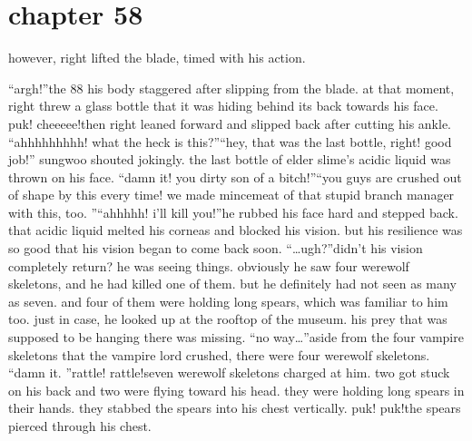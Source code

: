 \section{chapter 58}

                            however, right lifted the blade, timed with his action.





“argh!”the 88%
 his body staggered after slipping from the blade.
 at that moment, right threw a glass bottle that it was hiding behind its back towards his face.
puk! cheeeee!then right leaned forward and slipped back after cutting his ankle.
“ahhhhhhhhh! what the heck is this?”“hey, that was the last bottle, right! good job!” sungwoo shouted jokingly.
the last bottle of elder slime’s acidic liquid was thrown on his face.
“damn it! you dirty son of a bitch!”“you guys are crushed out of shape by this every time! we made mincemeat of that stupid branch manager with this, too.
”“ahhhhh! i’ll kill you!”he rubbed his face hard and stepped back.
 that acidic liquid melted his corneas and blocked his vision.
 but his resilience was so good that his vision began to come back soon.
“…ugh?”didn’t his vision completely return? he was seeing things.
 obviously he saw four werewolf skeletons, and he had killed one of them.
 but he definitely had not seen as many as seven.
 and four of them were holding long spears, which was familiar to him too.
 just in case, he looked up at the rooftop of the museum.
 his prey that was supposed to be hanging there was missing.
“no way…”aside from the four vampire skeletons that the vampire lord crushed, there were four werewolf skeletons.
“damn it.
”rattle! rattle!seven werewolf skeletons charged at him.
 two got stuck on his back and two were flying toward his head.
 they were holding long spears in their hands.
 they stabbed the spears into his chest vertically.
puk! puk!the spears pierced through his chest.

